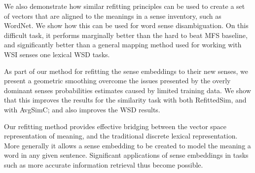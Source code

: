 \documentclass{article} %
\providecommand{\DIFaddbegin}{} %
\providecommand{\DIFaddend}{} %
\providecommand{\DIFdelbegin}{} %
\providecommand{\DIFdelend}{} %
\begin{document}
We also demonstrate how similar refitting principles can be used to create a set of vectors that are aligned to the meanings in a sense inventory, such as WordNet. We show how this can be used for word sense disambiguation.
On this difficult task, it performs marginally better than the hard to beat MFS baseline, and significantly better than a general mapping method used for working with WSI senses one lexical WSD tasks.

As part of our method for refitting the sense embeddings to their new senses, we present a geometric smoothing overcome the issues presented by the overly dominant senses probabilities estimates caused by limited training data.
We show that this improves the results for the similarity task with both RefittedSim, and with AvgSimC; and also improves the WSD results.

Our refitting method provides effective bridging between the vector space representation of meaning, and the traditional discrete lexical representation.
More generally it allows a sense embedding to be created to model the meaning a word in any given sentence. Significant applications  of sense embeddings in tasks such as more accurate information retrieval thus become possible.


\DIFdelbegin %
\DIFdelend %
{}
\DIFdelbegin %

\DIFdelend \DIFaddbegin 

 \DIFaddend
\end{document}
